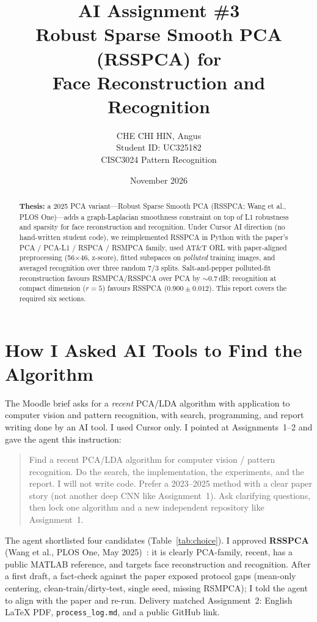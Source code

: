 \documentclass[11pt,a4paper]{article}
\title{\textbf{AI Assignment \#3}\\[0.25em]
\large Robust Sparse Smooth PCA (RSSPCA) for\\
Face Reconstruction and Recognition}
\author{CHE CHI HIN, Angus\\Student ID: UC325182\\CISC3024 Pattern Recognition}
\date{November 2026}
\begin{document}
\maketitle
\thispagestyle{fancy}

\begin{abstract}
\textbf{Thesis:} a 2025 PCA variant---Robust Sparse Smooth PCA (RSSPCA; Wang et al., PLOS One)---adds a graph-Laplacian smoothness constraint on top of L1 robustness and sparsity for face reconstruction and recognition.
Under Cursor AI direction (no hand-written student code), we reimplemented RSSPCA in Python with the paper's PCA / PCA-L1 / RSPCA / RSMPCA family, used AT\&T ORL with paper-aligned preprocessing (56$\times$46, z-score), fitted subspaces on \emph{polluted} training images, and averaged recognition over three random 7/3 splits.
Salt-and-pepper polluted-fit reconstruction favours RSMPCA/RSSPCA over PCA by $\sim$0.7\,dB; recognition at compact dimension ($r{=}5$) favours RSSPCA ($0.900{\pm}0.012$).
This report covers the required six sections.
\end{abstract}

\section{How I Asked AI Tools to Find the Algorithm}
The Moodle brief asks for a \emph{recent} PCA/LDA algorithm with application to computer vision and pattern recognition, with search, programming, and report writing done by an AI tool.
I used Cursor only.
I pointed at Assignments~1--2 and gave the agent this instruction:
\begin{quote}
\small
Find a recent PCA/LDA algorithm for computer vision / pattern recognition.
Do the search, the implementation, the experiments, and the report.
I will not write code.
Prefer a 2023--2025 method with a clear paper story (not another deep CNN like Assignment~1).
Ask clarifying questions, then lock one algorithm and a new independent repository like Assignment~1.
\end{quote}
The agent shortlisted four candidates (Table~\ref{tab:choice}).
I approved \textbf{RSSPCA} (Wang et al., PLOS One, May 2025)~\cite{wang2025rsspca}: it is clearly PCA-family, recent, has a public MATLAB reference, and targets face reconstruction and recognition.
After a first draft, a fact-check against the paper exposed protocol gaps (mean-only centering, clean-train/dirty-test, single seed, missing RSMPCA); I told the agent to align with the paper and re-run.
Delivery matched Assignment~2: English LaTeX PDF, \texttt{process\_log.md}, and a public GitHub link.
\end{document}
